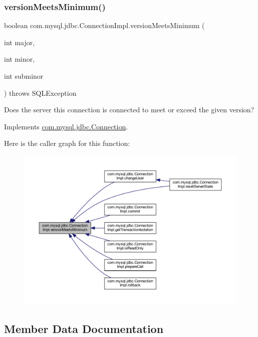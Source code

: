 \subsubsection{\texorpdfstring{version\+Meets\+Minimum()}{versionMeetsMinimum()}}
{\footnotesize\ttfamily boolean com.\+mysql.\+jdbc.\+Connection\+Impl.\+version\+Meets\+Minimum (\begin{DoxyParamCaption}\item[{int}]{major,  }\item[{int}]{minor,  }\item[{int}]{subminor }\end{DoxyParamCaption}) throws S\+Q\+L\+Exception}

Does the server this connection is connected to meet or exceed the given version? 

Implements \mbox{\hyperlink{interfacecom_1_1mysql_1_1jdbc_1_1_connection_af05f0b2545de1a6a1ca7d41f467516d3}{com.\+mysql.\+jdbc.\+Connection}}.

Here is the caller graph for this function\+:\nopagebreak
\begin{figure}[H]
\begin{center}
\leavevmode
\includegraphics[width=350pt]{classcom_1_1mysql_1_1jdbc_1_1_connection_impl_ac3cf366e43f103cfc8b29b81a2a1d25e_icgraph}
\end{center}
\end{figure}


\subsection{Member Data Documentation}
\mbox{\label{classcom_1_1mysql_1_1jdbc_1_1_connection_impl_a516ba1013c628f00d68091f6084e95e6}} 
